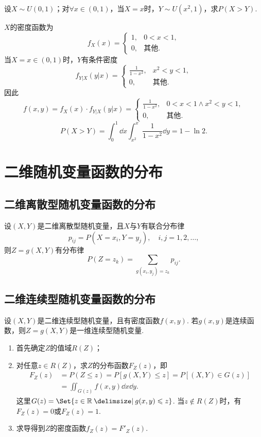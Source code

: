 \begin{example}
设\(X \sim U(0,1)\)；对\(\forall x\in(0,1)\)，当\(X=x\)时，\(Y \sim U(x^2,1)\)，求\(P(X > Y)\).
\begin{solution}
\(X\)的密度函数为\[
f_X(x) = \left\{ \begin{array}{cl}
1, & 0<x<1, \\
0, & \text{其他}.
\end{array} \right.
\]当\(X=x\in(0,1)\)时，\(Y\)有条件密度\[
f_{Y \vert X}(y \vert x)
= \left\{ \begin{array}{cl}
\frac{1}{1-x^2}, & x^2<y<1, \\
0, & \text{其他}.
\end{array} \right.
\]因此\[
f(x,y) = f_X(x) \cdot f_{Y \vert X}(y \vert x)
= \left\{ \begin{array}{cl}
\frac{1}{1-x^2}, & 0<x<1 \land x^2<y<1, \\
0, & \text{其他}.
\end{array} \right.
\]\[
P(X > Y)
= \int_0^1 \dd{x} \int_{x^2}^x \frac{1}{1-x^2} \dd{y}
= 1 - \ln2.
\]
\end{solution}
\end{example}

\section{二维随机变量函数的分布}
\subsection{二维离散型随机变量函数的分布}
设\((X,Y)\)是二维离散型随机变量，且\(X\)与\(Y\)有联合分布律\[
p_{ij} = P(X=x_i,Y=y_j), \quad i,j=1,2,\dotsc,
\]则\(Z = g(X,Y)\)有分布律\[
P(Z=z_k) = \sum_{g(x_i,y_j)=z_k}{p_{ij}}.
\]

\subsection{二维连续型随机变量函数的分布}
设\((X,Y)\)是二维连续型随机变量，且有密度函数\(f(x,y)\).
若\(g(x,y)\)是连续函数，则\(Z = g(X,Y)\)是一维连续型随机变量.
\begin{enumerate}
\item 首先确定\(Z\)的值域\(R(Z)\)；
\item 对任意\(z \in R(Z)\)，求\(Z\)的分布函数\(F_Z(z)\)，即\begin{align*}
F_Z(z) &= P(Z \leqslant z)
= P[g(X,Y) \leqslant z]
= P[(X,Y) \in G(z)] \\
&= \iint_{G(z)} f(x,y) \dd{x}\dd{y}.
\end{align*}
这里\(G(z) = \Set{ z\in\mathbb{R} \given g(x,y) \leqslant z }\).
当\(z \notin R(Z)\)时，有\(F_Z(z)=0\)或\(F_Z(z)=1\).
\item 求导得到\(Z\)的密度函数\(f_Z(z) = F'_Z(z)\).
\end{enumerate}

